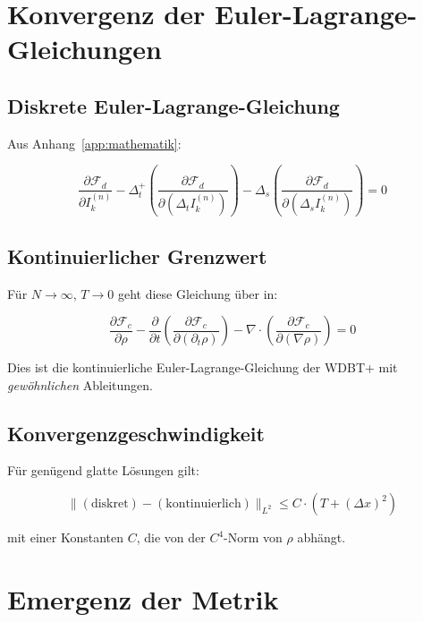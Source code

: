 \section{Konvergenz der Euler-Lagrange-Gleichungen}
\label{app:kontinuumslimes_euler_lagrange}

\subsection{Diskrete Euler-Lagrange-Gleichung}
\label{sub:kontinuumslimes_euler_diskret}

Aus Anhang~\ref{app:mathematik}:

\[
\frac{\partial \mathcal{F}_d}{\partial I_k^{(n)}} - \Delta_t^+ \left(
\frac{\partial \mathcal{F}_d}{\partial (\Delta_t I_k^{(n)})} \right) -
\Delta_s \left( \frac{\partial \mathcal{F}_d}{\partial (\Delta_s I_k^{(n)})} \right) = 0
\]

\subsection{Kontinuierlicher Grenzwert}
\label{sub:kontinuumslimes_euler_kont}

Für \( N \to \infty \), \( T \to 0 \) geht diese Gleichung über in:

\[
\frac{\partial \mathcal{F}_c}{\partial \rho} - \frac{\partial}{\partial t} \left(
\frac{\partial \mathcal{F}_c}{\partial (\partial_t \rho)} \right) -
\nabla \cdot \left( \frac{\partial \mathcal{F}_c}{\partial (\nabla \rho)} \right) = 0
\]

Dies ist die kontinuierliche Euler-Lagrange-Gleichung der WDBT+ mit \emph{gewöhnlichen}
Ableitungen.

\subsection{Konvergenzgeschwindigkeit}
\label{sub:kontinuumslimes_geschwindigkeit}

Für genügend glatte Lösungen gilt:

\[
\| (\text{diskret}) - (\text{kontinuierlich}) \|_{L^2} \le C \cdot (T + (\Delta x)^2)
\]

mit einer Konstanten \( C \), die von der \( C^4 \)-Norm von \( \rho \) abhängt.

\section{Emergenz der Metrik}
\label{app:kontinuumslimes_metrik_emergenz}


